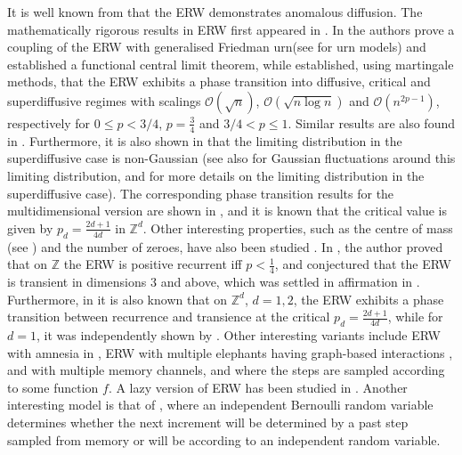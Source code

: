 \documentclass{article}
\numberwithin{equation}{section}
\newcommand{\OO}{\mbox{${\mathcal O}$}}
\newcommand{\Z}{\mbox{${\mathbb Z}$}}
\newcommand{\1}{\mathbf{1}}
\newcommand{\0}{\mathbf{0}}
\begin{document}
It is well known from \cite{Sc_Tr_2004} that the ERW demonstrates anomalous diffusion. The mathematically rigorous results in ERW first appeared in \cite{Be_2018, Ba_Be_2016}. In \cite{Ba_Be_2016} the authors prove a coupling of the ERW with generalised Friedman urn(see\cite{Fre_65, Ja_2004} for urn models) and established a functional central limit theorem, while \cite{Be_2018} established, using martingale methods, that the ERW exhibits a phase transition into diffusive, critical and superdiffusive regimes with scalings $\OO(\sqrt{n})$, $\OO(\sqrt{n \log n})$ and $\OO(n^{2p-1})$, respectively for $0 \le p < 3/4$, $p=\frac{3}{4}$ and $3/4 < p \le 1$. Similar results are also found in \cite{coletti2017central}. Furthermore, it is also shown in \cite{Be_2018} that the limiting distribution in the superdiffusive case is non-Gaussian (see also \cite{Kubota2019Gaussian} for Gaussian fluctuations around this limiting distribution, and \cite{Gu_La_Ra_Si_2025, Gu_La_Ra_2026} for more details on the limiting distribution in the superdiffusive case). The corresponding phase transition results for the multidimensional version are shown in \cite{Be_La_2019a}, and it is known that the critical value is given by $p_d = \frac{2d+1}{4d}$ in $\Z^d$. Other interesting properties, such as the centre of mass (see \cite{Be_2018}) and the number of zeroes, have also been studied \cite{Ber_2022}. In \cite{Ber_2022}, the author proved that on $\Z$ the ERW is positive recurrent iff $p < \frac{1}{4}$, and conjectured that the ERW is transient in dimensions $3$ and above, which was settled in affirmation in \cite{Qin_2025}. Furthermore, in \cite{Qin_2025} it is also known that on $\Z^d$, $d=1,2$, the ERW exhibits a phase transition between recurrence and transience at the critical $p_d = \frac{2d+1}{4d}$, while for $d=1$, it was independently shown by \cite{Gu_La_Ra_2026}. Other interesting variants include ERW with amnesia in \cite{La_2022}, ERW with multiple elephants having graph-based interactions \cite{Da_2024}, and \cite{Ma_Ro_Sa_2025} with multiple memory channels, and \cite{Po_Ro_2026} where the steps are sampled according to some function $f$. A lazy version of ERW has been studied in \cite{bercu2022_lazy}. Another interesting model is that of \cite{gonzalez2021reinforced}, where an independent Bernoulli random variable determines whether the next increment will be determined by a past step sampled from memory or will be according to an independent random variable.
\end{document}
